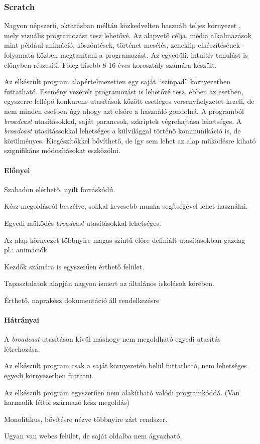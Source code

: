 \documentclass[12pt,a4paper,oneside]{report} %
\begin{document}
\subsubsection{Scratch} 
\label{scratch}
Nagyon népszerű, oktatásban méltán közkedvelten használt teljes környezet \cite{maloney2010scratch, resnick2009scratch, ScratchUrl2019Jan}, mely vizuális programozást tesz lehetővé. Az alapvető célja, média alkalmazások mint például animáció, köszöntések, történet mesélés, zeneklip elkészítésének - folyamata közben megtanítani a programozást. Az egyedüli, intuitív tanulást is előnyben részesíti. Főleg kisebb 8-16 éves korosztály számára készült. 
\par Az elkészült program alapértelmezetten egy saját ``{színpad}'' környezetben futtatható. Esemény vezérelt programozást is lehetővé tesz, ebben az esetben, egyszerre fellépő konkurens utasítások között esetleges versenyhelyzetet kezeli, de nem minden esetben úgy ahogy azt elsőre a használó gondolná.  A programból \textit{broadcast} utasításokkal, saját parancsok, szkriptek végrehajtása lehetséges. A \textit{broadcast} utasítássokkal lehetséges a külvilággal történő kommunikáció is, de körülményes. Kiegészítőkkel bővíthető, de így sem lehet az alap működésre kiható szignifikáns módosításokat eszközölni.
\paragraph{Előnyei} 
\begin{compactitem}
	\item Szabadon elérhető, nyílt forráskódú.
	\item Kész megoldásról beszélve, sokkal kevesebb munka segítségével lehet használni.
	\item Egyedi működés \textit{broadcast} utasításokkal lehetséges.
	\item Az alap környezet többnyire magas szintű előre definiált utasításokban gazdag pl.: animációk
	\item Kezdők számára is egyszerűen érthető felület.
	\item Tapasztalatok alapján nagyon ismert az általános iskolások körében.
	\item Érthető, naprakész dokumentáció áll rendelkezésre
\end{compactitem}
\paragraph{Hátrányai} 
\begin{compactitem}
	\item A \textit{broadcast} utasításon kívül máshogy nem megoldható egyedi utasítás létrehozása.
	\item Az elkészült program csak a saját környezetén belül futtatható, nem lehetséges egyedi környezetben futtatni.
	\item Az elkészült program egyszerűen nem alakítható valódi programkóddá. (Van harmadik féltől származó kész megoldás)
	\item Monolitikus, bővítésre nézve többnyire zárt rendszer.
	\item Ugyan van webes felület, de saját oldalba nem ágyazható.
\end{compactitem}
\end{document}
